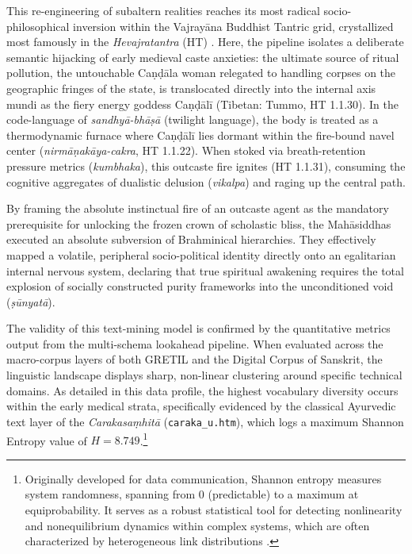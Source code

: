 \documentclass[11pt,twoside,letterpaper]{article}
\begin{document}
This re-engineering of subaltern realities reaches its most radical socio-philosophical inversion within the Vajrayāna Buddhist Tantric grid, crystallized most famously in the \textit{Hevajratantra} (HT) \citep{Farrow2003}. Here, the pipeline isolates a deliberate semantic hijacking of early medieval caste anxieties: the ultimate source of ritual pollution, the untouchable Caṇḍāla woman relegated to handling corpses on the geographic fringes of the state, is translocated directly into the internal axis mundi as the fiery energy goddess Caṇḍālī (Tibetan: Tummo, HT 1.1.30). In the code-language of \textit{sandhyā-bhāṣā} (twilight language), the body is treated as a thermodynamic furnace where Caṇḍālī lies dormant within the fire-bound navel center (\textit{nirmāṇakāya-cakra}, HT 1.1.22). When stoked via breath-retention pressure metrics (\textit{kumbhaka}), this outcaste fire ignites (HT 1.1.31), consuming the cognitive aggregates of dualistic delusion (\textit{vikalpa}) and raging up the central path.

By framing the absolute instinctual fire of an outcaste agent as the mandatory prerequisite for unlocking the frozen crown of scholastic bliss, the Mahāsiddhas executed an absolute subversion of Brahminical hierarchies. They effectively mapped a volatile, peripheral socio-political identity directly onto an egalitarian internal nervous system, declaring that true spiritual awakening requires the total explosion of socially constructed purity frameworks into the unconditioned void (\textit{ṣūnyatā}).

The validity of this text-mining model is confirmed by the quantitative metrics output from the multi-schema lookahead pipeline. When evaluated across the macro-corpus layers of both GRETIL and the Digital Corpus of Sanskrit, the linguistic landscape displays sharp, non-linear clustering around specific technical domains. As detailed in this data profile, the highest vocabulary diversity occurs within the early medical strata, specifically evidenced by the classical Ayurvedic text layer of the \textit{Carakasaṃhitā} (\texttt{caraka\_u.htm}), which logs a maximum Shannon Entropy value of $H = 8.749$.\footnote{Originally developed for data communication, Shannon entropy measures system randomness, spanning from 0 (predictable) to a maximum at equiprobability. It serves as a robust statistical tool for detecting nonlinearity and nonequilibrium dynamics within complex systems, which are often characterized by heterogeneous link distributions \cite{karaca2022}.}
\end{document}
